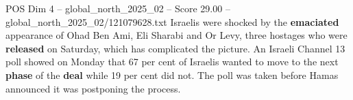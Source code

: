 \begin{textsample}{POS Dim 4 – global\_north\_2025\_02 – Score 29.00 – global\_north\_2025\_02/121079628.txt}
Israelis were shocked by the \textbf{emaciated} appearance of Ohad Ben Ami, Eli Sharabi and Or Levy, three hostages who were \textbf{released} on Saturday, which has complicated the picture.
An Israeli Channel 13 poll showed on Monday that 67 per cent of Israelis wanted to move to the next \textbf{phase} of the \textbf{deal} while 19 per cent did not.
The poll was taken before Hamas announced it was postponing the process.

\end{textsample}

